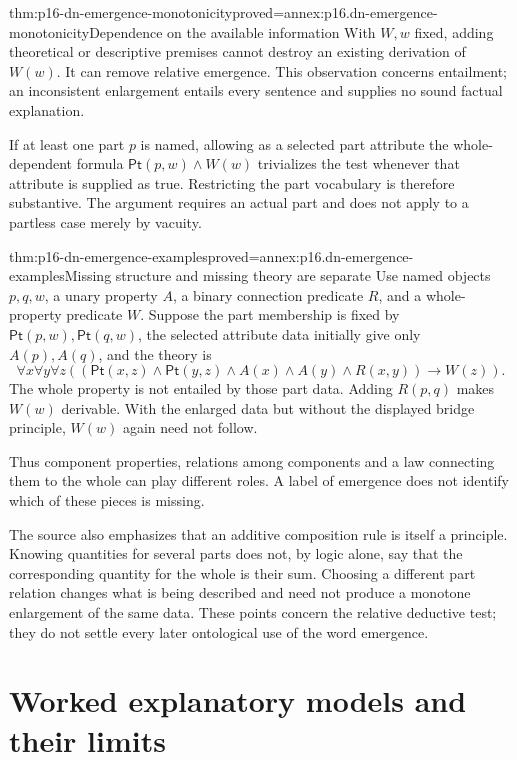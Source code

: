 \begin{hbtheorem}{thm:p16-dn-emergence-monotonicity}{proved=annex:p16.dn-emergence-monotonicity}{Dependence on the available information}
With \(W,w\) fixed, adding theoretical or descriptive
premises cannot destroy an existing derivation of
\(W(w)\). It can remove relative emergence.
This observation concerns entailment; an inconsistent
enlargement entails every sentence and supplies
no sound factual explanation.

If at least one part \(p\) is named, allowing as
a selected part attribute the whole-dependent
formula \(\mathsf{Pt}(p,w)\land W(w)\) trivializes
the test whenever that attribute is supplied
as true. Restricting the part vocabulary is
therefore substantive. The argument requires
an actual part and does not apply to a partless
case merely by vacuity.
\end{hbtheorem}

\begin{hbtheorem}{thm:p16-dn-emergence-examples}{proved=annex:p16.dn-emergence-examples}{Missing structure and missing theory are separate}
Use named objects \(p,q,w\), a unary property \(A\),
a binary connection predicate \(R\), and a
whole-property predicate \(W\). Suppose the
part membership is fixed by
\(\mathsf{Pt}(p,w),\mathsf{Pt}(q,w)\), the
selected attribute data initially give only
\(A(p),A(q)\), and the theory is
\[
             \forall x\forall y\forall z
 ((\mathsf{Pt}(x,z)\land\mathsf{Pt}(y,z)\land
                       A(x)\land A(y)\land R(x,y))\to W(z)).
\]
The whole property is not entailed by those
part data. Adding \(R(p,q)\) makes \(W(w)\)
derivable. With the enlarged data but without
the displayed bridge principle, \(W(w)\)
again need not follow.

Thus component properties, relations among
components and a law connecting them to
the whole can play different roles. A label
of emergence does not identify which of
these pieces is missing.
\end{hbtheorem}

The source also emphasizes that an additive
composition rule is itself a principle.
Knowing quantities for several parts does
not, by logic alone, say that the corresponding
quantity for the whole is their sum.
Choosing a different part relation changes
what is being described and need not produce
a monotone enlargement of the same data.
These points concern the relative deductive
test; they do not settle every later
ontological use of the word emergence.

\section{Worked explanatory models and their limits}
\label{sec:p16-dn-examples}

